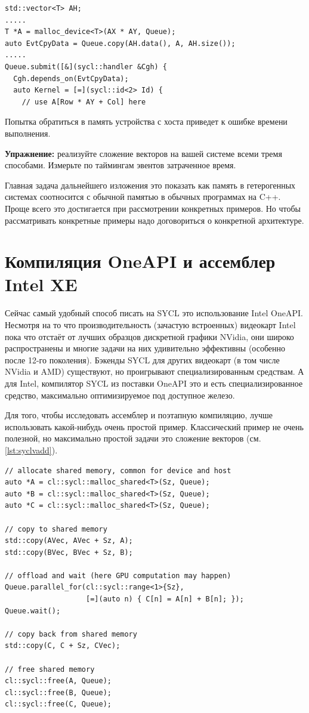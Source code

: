 \documentclass[a4paper,12pt,oneside]{article}
\begin{document}
\begin{lstlisting}[caption={Явная пересылка на устройство},label={lst:devicemem}]
std::vector<T> AH;
.....
T *A = malloc_device<T>(AX * AY, Queue);
auto EvtCpyData = Queue.copy(AH.data(), A, AH.size());
.....
Queue.submit([&](sycl::handler &Cgh) { 
  Cgh.depends_on(EvtCpyData);
  auto Kernel = [=](sycl::id<2> Id) {
    // use A[Row * AY + Col] here
\end{lstlisting}

Попытка обратиться в память устройства с хоста приведет к ошибке времени выполнения.

\textbf{Упражнение:} реализуйте сложение векторов на вашей системе всеми тремя способами. Измерьте по таймингам эвентов затраченное время.

Главная задача дальнейшего изложения это показать как память в гетерогенных системах соотносится с обычной памятью в обычных программах на C++.
Проще всего это достигается при рассмотрении конкретных примеров.
Но чтобы рассматривать конкретные примеры надо договориться о конкретной архитектуре.

\pagebreak
\section{Компиляция OneAPI и ассемблер Intel XE}\label{sec:IntelXE}

Сейчас самый удобный способ писать на SYCL это использование Intel OneAPI.
Несмотря на то что производительность (зачастую встроенных) видеокарт Intel пока что отстаёт от лучших образцов дискретной графики NVidia, они широко распространены и многие задачи на них удивительно эффективны (особенно после 12-го поколения).
Бэкенды SYCL для других видеокарт (в том числе NVidia и AMD) существуют, но проигрывают специализированным средствам.
А для Intel, компилятор SYCL из поставки OneAPI это и есть специализированное средство, максимально оптимизируемое под доступное железо.

Для того, чтобы исследовать ассемблер и поэтапную компиляцию, лучше использовать какой-нибудь очень простой пример.
Классический пример не очень полезной, но максимально простой задачи это сложение векторов (см. \ref{lst:syclvadd}).

\begin{lstlisting}[caption={Сложение векторов на SYCL},label={lst:syclvadd}]
// allocate shared memory, common for device and host
auto *A = cl::sycl::malloc_shared<T>(Sz, Queue);
auto *B = cl::sycl::malloc_shared<T>(Sz, Queue);
auto *C = cl::sycl::malloc_shared<T>(Sz, Queue);

// copy to shared memory
std::copy(AVec, AVec + Sz, A);
std::copy(BVec, BVec + Sz, B);

// offload and wait (here GPU computation may happen)
Queue.parallel_for(cl::sycl::range<1>{Sz},
                   [=](auto n) { C[n] = A[n] + B[n]; });
Queue.wait();

// copy back from shared memory
std::copy(C, C + Sz, CVec);

// free shared memory 
cl::sycl::free(A, Queue);
cl::sycl::free(B, Queue);
cl::sycl::free(C, Queue);
\end{lstlisting}
\end{document}
